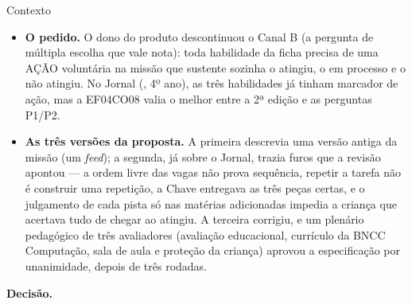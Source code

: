 \begin{especificacao}{Contexto}
\begin{itemize}
  \item \textbf{O pedido.} O dono do produto descontinuou o Canal B (a pergunta
    de múltipla escolha que vale nota): toda habilidade da ficha precisa de uma
    AÇÃO voluntária na missão que sustente sozinha o atingiu, o em processo e o
    não atingiu. No Jornal (, 4º ano), as três habilidades já
    tinham marcador de ação, mas a EF04CO08 valia o melhor entre a 2ª edição e
    as perguntas P1/P2.
  \item \textbf{As três versões da proposta.} A primeira descrevia uma versão
    antiga da missão (um \emph{feed}); a segunda, já sobre o Jornal, trazia
    furos que a revisão apontou --- a ordem livre das vagas não prova
    sequência, repetir a tarefa não é construir uma repetição, a Chave entregava
    as três peças certas, e o julgamento de cada pista só nas matérias adicionadas impedia a criança
    que acertava tudo de chegar ao atingiu. A terceira corrigiu, e um plenário
    pedagógico de três avaliadores (avaliação educacional, currículo da BNCC
    Computação, sala de aula e proteção da criança) aprovou a especificação por
    unanimidade, depois de três rodadas.
\end{itemize}
\end{especificacao}

\textbf{Decisão.}

